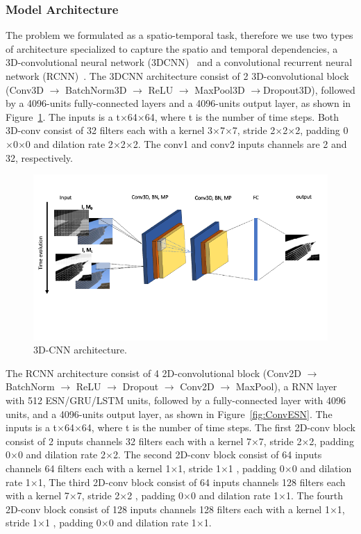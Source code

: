 \documentclass{WitsPhysicsReport}
\begin{document}
\subsubsection{Model Architecture}
The problem we formulated as a spatio-temporal task, therefore we use two types of architecture specialized to capture the spatio and temporal dependencies, a 3D-convolutional neural network (3DCNN)~\cite{tran2015learning} and a convolutional recurrent neural network (RCNN)~\cite{ji20123d, wang2016cnn}. The 3DCNN architecture consist of 2 3D-convolutional block (Conv3D
$\rightarrow$
BatchNorm3D
$\rightarrow$
ReLU
$\rightarrow$
MaxPool3D
$\rightarrow
$Dropout3D), followed by a 4096-units fully-connected layers and a 4096-units output layer, as shown in Figure~\ref{fig:3dCNN}.  The inputs is a t$\times$64$\times$64, where t is the number of time steps. Both 3D-conv consist of 32 filters each with a kernel 3$\times$7$\times$7, stride 2$\times$2$\times$2, padding 0$\times$0$\times$0 and dilation rate 2$\times$2$\times$2. The conv1 and conv2 inputs channels are 2 and 32, respectively.



\begin{figure}[H]
\centering
\includegraphics[width=1\textwidth]{Figure/3dcnn.png}
\caption{3D-CNN architecture.}
\label{fig:3dCNN}
\end{figure}


The RCNN architecture consist of 4 2D-convolutional block (Conv2D
$\rightarrow$
BatchNorm
$\rightarrow$
ReLU
$\rightarrow$
Dropout
$\rightarrow$
Conv2D
$\rightarrow$
MaxPool), a RNN layer with 512 ESN/GRU/LSTM units, followed by a fully-connected layer with 4096 units, and a 4096-units output layer, as shown in Figure~\ref{fig:ConvESN}. The inputs is a t$\times$64$\times$64, where t is the number of time steps. The first 2D-conv block consist of 2 inputs channels  32 filters each with a kernel 7$\times$7, stride 2$\times$2, padding 0$\times$0 and dilation rate 2$\times$2.  The second 2D-conv block consist of 64 inputs channels  64 filters each with a kernel 1$\times$1, stride 1$\times$1 , padding 0$\times$0 and dilation rate 1$\times$1, The third 2D-conv block consist of 64 inputs channels  128 filters each with a kernel 7$\times$7, stride 2$\times$2 , padding 0$\times$0 and dilation rate 1$\times$1. The fourth 2D-conv block consist of 128 inputs channels  128 filters each with a kernel 1$\times$1, stride 1$\times$1 , padding 0$\times$0 and dilation rate 1$\times$1.
\end{document}
